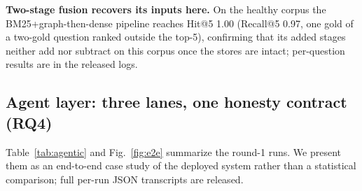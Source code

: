 \textbf{Two-stage fusion recovers its inputs here.} On the healthy corpus
the BM25+graph-then-dense pipeline reaches Hit@5 1.00 (Recall@5 0.97, one gold of a two-gold question ranked
outside the top-5), confirming that its added stages
 neither add nor subtract on this corpus once the stores are intact;
per-question results are in the released logs.

\subsection{Agent layer: three lanes, one honesty contract (RQ4)}
\label{sec:agentic}

\begin{table}[!htbp]
\centering
\small
\caption{Agentic end-to-end runs, round 1: four questions $\times$ four
arms through the public chat API (engine \texttt{omp} over GLM-5.3-Flash,
20-turn budget; the full grid is run twice, see text). ``Cite'' = the
answer names the gold document;
``Facts'' = ground-truth fact markers contained / available. The bare
arm's sporadic marker matches are coincidental: it cites no source, and
its answers typically disclaim figures as unverified parametric recall.}
\label{tab:agentic}

\end{table}

Table~\ref{tab:agentic} and Fig.~\ref{fig:e2e} summarize the round-1 runs.
We present them as an end-to-end case study of the deployed system rather
than a statistical comparison; full per-run JSON transcripts are released.

